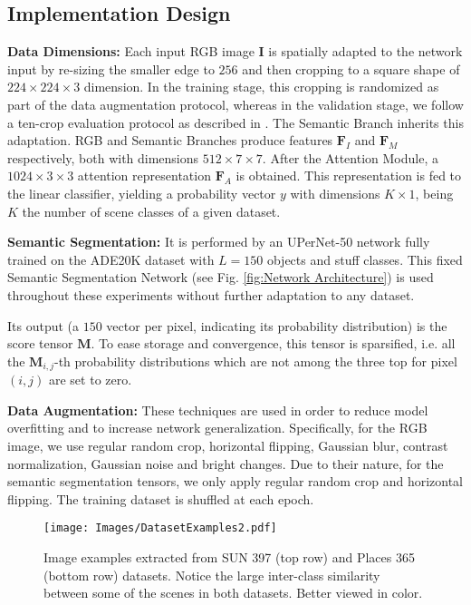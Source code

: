 \documentclass[review, 3p, sort&compress]{elsarticle}
\begin{document}
\subsection{Implementation Design}\label{Implementation Details}
\textbf{Data Dimensions:} Each input RGB image \(\textbf{I}\) is spatially adapted to the network input by re-sizing the smaller edge to \(256\) and then cropping to a square shape of \(224 \times 224 \times 3\) dimension. In the training stage, this cropping is randomized as part of the data augmentation protocol, whereas in the validation stage, we follow a ten-crop evaluation protocol as described in \cite{zhou2018places}. The Semantic Branch inherits this adaptation. RGB and Semantic Branches produce features \(\textbf{F}_I\) and \(\textbf{F}_M\) respectively, both with dimensions \(512 \times 7 \times 7\). After the Attention Module, a \(1024 \times 3 \times 3\) attention representation \(\textbf{F}_A\) is obtained. This representation is fed to the linear classifier, yielding a probability vector \(y\) with dimensions \(K \times 1\), being \(K\) the number of scene classes of a given dataset.

\textbf{Semantic Segmentation:} It is performed by an UPerNet-50 network \cite{xiao2018unified} fully trained on the ADE20K dataset with \(L=150\) objects and stuff classes. This fixed Semantic Segmentation Network (see Fig. \ref{fig:Network Architecture}) is used throughout these experiments without further adaptation to any dataset.

Its output (a \(150\) vector per pixel, indicating its probability distribution) is the score tensor \(\textbf{M}\). To ease storage and convergence, this tensor is sparsified, i.e. all the \(\textbf{M}_{i,j}\)-th probability distributions which are not among the three top for pixel \((i,j)\) are set to zero.

\textbf{Data Augmentation:} These techniques are used in order to reduce model overfitting and to increase network generalization. Specifically, for the RGB image, we use regular random crop, horizontal flipping, Gaussian blur, contrast normalization, Gaussian noise and bright changes. Due to their nature, for the semantic segmentation tensors, we only apply regular random crop and horizontal flipping. The training dataset is shuffled at each epoch.

\begin{figure*}[t!]
    \centering
    \texttt{[image: Images/DatasetExamples2.pdf]}
    \caption{Image examples extracted from SUN 397 \cite{xiao2010sun} (top row) and Places 365 \cite{zhou2018places} (bottom row) datasets. Notice the large inter-class similarity between some of the scenes in both datasets. Better viewed in color.}
    \label{fig:DatasetExamples2}
\end{figure*}
\end{document}
